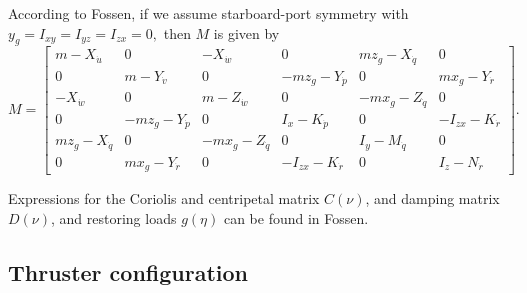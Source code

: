 \documentclass[a4paper,twoside,english]{report}
\begin{document}
According to Fossen, if we assume starboard-port symmetry with $y_{g}=I_{xy}=I_{yz}=I_{zx}=0,$
then $M$ is given by 
\begin{equation}
M=\left[\begin{array}{cccccc}
m-X_{\dot{u}} & 0 & -X_{\dot{w}} & 0 & mz_{g}-X_{\dot{q}} & 0\\
0 & m-Y_{\dot{v}} & 0 & -mz_{g}-Y_{\dot{p}} & 0 & mx_{g}-Y_{\dot{r}}\\
-X_{\dot{w}} & 0 & m-Z_{\dot{w}} & 0 & -mx_{g}-Z_{\dot{q}} & 0\\
0 & -mz_{g}-Y_{\dot{p}} & 0 & I_{x}-K_{\dot{p}} & 0 & -I_{zx}-K_{\dot{r}}\\
mz_{g}-X_{\dot{q}} & 0 & -mx_{g}-Z_{\dot{q}} & 0 & I_{y}-M_{\dot{q}} & 0\\
0 & mx_{g}-Y_{\dot{r}} & 0 & -I_{zx}-K_{\dot{r}} & 0 & I_{z}-N_{\dot{r}}
\end{array}\right].\label{Eq_M66}
\end{equation}

Expressions for the Coriolis and centripetal matrix $C(\nu)$, and
damping matrix $D(\nu)$, and restoring loads $g(\eta)$ can be found
in Fossen.

\subsection{Thruster configuration}
\end{document}
